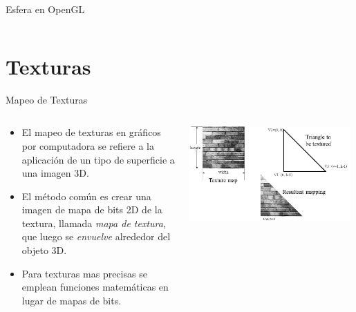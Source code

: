 \documentclass[aspectratio=169,compress]{beamer}
\begin{document}
\begin{frame}{Esfera en OpenGL}
\begin{columns}
\begin{column}{0.3\textwidth}
\begin{center}
\end{center}
\end{column}
\end{columns}


\end{frame}



\section{Texturas}
\begin{frame}{Mapeo de Texturas}
\begin{columns}
\begin{column}{0.6\textwidth}
\begin{itemize}
\item El mapeo de texturas en gráficos por computadora se refiere a la aplicación de un tipo de superficie a una imagen 3D. 
\item El método común es crear una imagen de mapa de bits 2D de la textura, llamada \textit{mapa de textura}, que luego se \textit{envuelve} alrededor del objeto 3D. 
\item Para texturas mas precisas se emplean funciones matemáticas en lugar de mapas de bits.
\end{itemize}
\end{column}
\begin{column}{0.4\textwidth}
    \begin{center}
         \includegraphics[width=0.98\textwidth]{FigsOpenGL/Textures}
     \end{center}
\end{column}
\end{columns}
\end{frame}
\end{document}

